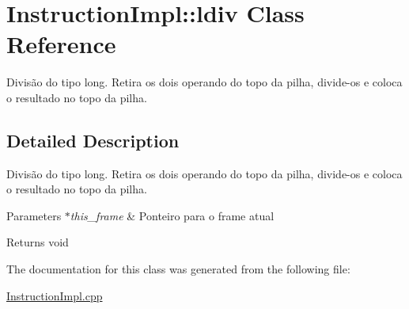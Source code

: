 \hypertarget{class_instruction_impl_1_1ldiv}{}\section{Instruction\+Impl\+:\+:ldiv Class Reference}
\label{class_instruction_impl_1_1ldiv}


Divisão do tipo long. Retira os dois operando do topo da pilha, divide-\/os e coloca o resultado no topo da pilha.  




\subsection{Detailed Description}
Divisão do tipo long. Retira os dois operando do topo da pilha, divide-\/os e coloca o resultado no topo da pilha. 


\begin{DoxyParams}{Parameters}
{\em $\ast$this\+\_\+frame} & Ponteiro para o frame atual \\
\hline
\end{DoxyParams}
\begin{DoxyReturn}{Returns}
void 
\end{DoxyReturn}


The documentation for this class was generated from the following file\+:\begin{DoxyCompactItemize}
\item 
\hyperlink{_instruction_impl_8cpp}{Instruction\+Impl.\+cpp}\end{DoxyCompactItemize}
